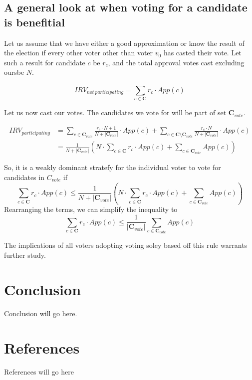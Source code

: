 \documentclass{article}
\begin{document}
\subsection{A general look at when voting for a candidate is benefitial}
Let us assume that we have either a good approximation or know the result of the election if every other voter other than voter $v_0$ has casted their vote. Let such a result for candidate $c$ be $r_c$, and the total approval votes cast excluding oursbe $N$.

\begin{equation}
    {IRV}_{not\ participating} = \sum^{}_{c \in \boldsymbol{C}}{r_c \cdot {App}(c)}
\end{equation}

Let us now cast our votes. The candidates we vote for will be part of set $\boldsymbol{C}_{vote}$.

\begin{equation}
\begin{aligned}
{IRV}_{participating} &= \sum^{}_{c \in \boldsymbol{C}_{vote}}{\frac{r_c \cdot N + 1}{N + |\boldsymbol{C}_{vote}|} \cdot {App}(c)} + \sum^{}_{c \in \boldsymbol{C} \setminus \boldsymbol{C}_{vote}}{\frac{r_c \cdot N}{N + |\boldsymbol{C}_{vote}|} \cdot {App}(c)}\\
&= \frac{1}{N+|\boldsymbol{C}_{vote}|}\left( N \cdot \sum^{}_{c \in \boldsymbol{C}}{r_c \cdot {App}(c)} + \sum^{}_{c \in \boldsymbol{C}_{vote}}{{App}(c)} \right)
\end{aligned}
\end{equation}

So, it is a weakly dominant stratefy for the individual voter to vote for candidates in $C_{vote}$ if 
\begin{equation}
    \sum^{}_{c \in \boldsymbol{C}}{r_c \cdot {App}(c)} \leq \frac{1}{N+|\boldsymbol{C}_{vote}|}\left( N \cdot \sum^{}_{c \in \boldsymbol{C}}{r_c \cdot {App}(c)} + \sum^{}_{c \in \boldsymbol{C}_{vote}}{{App}(c)} \right)
\end{equation}
Rearranging the terms, we can simplify the inequality to
\begin{equation}
    \sum^{}_{c \in \boldsymbol{C}}{r_c \cdot {App}(c)} \leq \frac{1}{|\boldsymbol{C}_{vote}|}\sum^{}_{c \in \boldsymbol{C}_{vote}}{{App}(c)}
\end{equation}

The implications of all voters adopting voting soley based off this rule warrants further study.

\section{Conclusion}

Conclusion will go here.

\section{References}

References will go here
\end{document}
